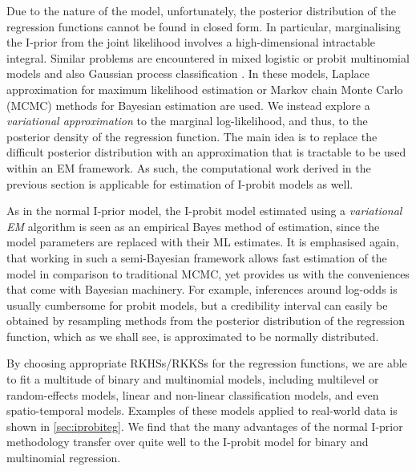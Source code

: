 \documentclass[a4paper,showframe,11pt]{report}
\begin{document}

Due to the nature of the model, unfortunately, the posterior distribution of the regression functions cannot be found in closed form.
In particular, marginalising the I-prior from the joint likelihood involves a high-dimensional intractable integral.
Similar problems are encountered in mixed logistic or probit multinomial models \citep{breslow1993approximate,mcculloch2000bayesian} and also Gaussian process classification \citep{neal1999,rasmussen2006gaussian} .
In these models, Laplace approximation for maximum likelihood estimation or Markov chain Monte Carlo (MCMC) methods for Bayesian estimation are used. 
We instead explore a \emph{variational approximation} to the marginal log-likelihood, and thus, to the posterior density of the regression function.
The main idea is to replace the difficult posterior distribution with an approximation that is tractable to be used within an EM framework.
As such, the computational work derived in the previous section is applicable for estimation of I-probit models as well.

As in the normal I-prior model, the I-probit model estimated using a \emph{variational EM} algorithm is seen as an empirical Bayes method of estimation, since the model parameters are replaced with their ML estimates.
It is emphasised again, that working in such a semi-Bayesian framework allows fast estimation of the model in comparison to traditional MCMC, yet provides us with the conveniences that come with Bayesian machinery.
For example, inferences around log-odds is usually cumbersome for probit models, but a credibility interval can easily be obtained by resampling methods from the posterior distribution of the regression function, which as we shall see, is approximated to be normally distributed.

By choosing appropriate RKHSs/RKKSs for the regression functions, we are able to fit a multitude of binary and multinomial models, including multilevel or random-effects models, linear and non-linear classification models, and even spatio-temporal models.
Examples of these models applied to real-world data is shown in  \cref{sec:iprobiteg}.
We find that the many advantages of the normal I-prior methodology  transfer over quite well to the I-probit model for binary and multinomial regression.
\end{document}
